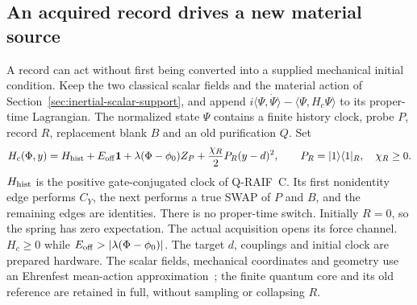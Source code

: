 \documentclass[12pt,a4paper]{article}
\begin{document}
\subsection{An acquired record drives a new material source}
\label{sec:record-actuated-source}

A record can act without first being converted into a supplied mechanical
initial condition. Keep the two classical scalar fields and the material
action of Section~\ref{sec:inertial-scalar-support}, and append
$i\langle\Psi,\dot\Psi\rangle-\langle\Psi,H_c\Psi\rangle$ to its
proper-time Lagrangian. The normalized state $\Psi$ contains a finite
history clock, probe $P$, record $R$, replacement blank $B$ and an old
purification $Q$. Set
\begin{equation}\label{eq:record-spring-core}
 H_c(\Phi,y)=H_{\rm hist}+E_{\rm off}\mathbf1
       +\lambda(\Phi-\phi_0)Z_P
       +\frac{\chi_R}{2}P_R(y-d)^2,
 \qquad P_R=|1\rangle\langle1|_R,\quad\chi_R\ge0.
\end{equation}
$H_{\rm hist}$ is the positive gate-conjugated clock of Q-RAIF~C.
Its first nonidentity edge performs $C_Y$, the next performs a true
SWAP of $P$ and $B$, and the remaining edges are identities.
There is no proper-time switch. Initially $R=0$, so the spring has
zero expectation. The actual acquisition opens its force channel.
$H_c\ge0$ while $E_{\rm off}>|\lambda(\Phi-\phi_0)|$.
The target $d$, couplings and initial clock are prepared hardware.
The scalar fields, mechanical coordinates and geometry use an Ehrenfest
mean-action approximation~\cite[Section~2]{CastroGross2013};
the finite quantum core and its old reference are retained
in full, without sampling or collapsing $R$.
\end{document}
